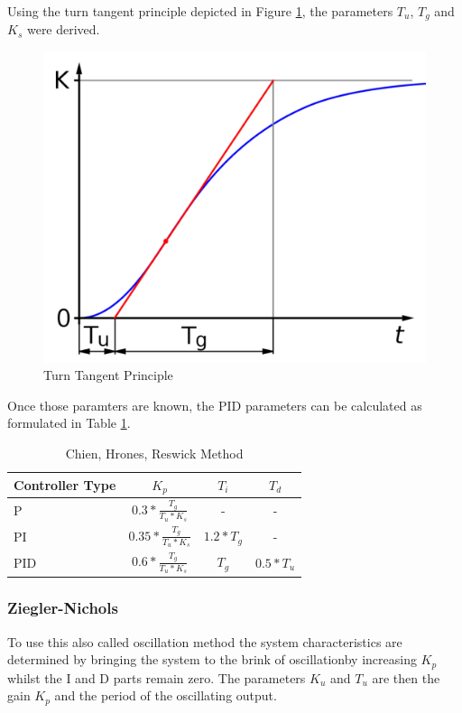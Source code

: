 Using the turn tangent principle depicted in Figure \ref{fig:wendetangentenverfahren}, the parameters $T_u$, $T_g$ and $K_s$ were derived.

\begin{figure}[H]
\begin{center}
\includegraphics[width=0.6\linewidth]{images/general/wendetangentenverfahren}
\end{center}
\caption{Turn Tangent Principle}
\label{fig:wendetangentenverfahren}
\end{figure}

Once those paramters are known, the PID parameters can be calculated as formulated in Table \ref{tab:chien}.

\begin{table}[H]
\begin{center}
\begin{tabular}{ l | c | c | c}
  Controller Type & $K_p$ & $T_i$ & $T_d$\\
  \hline
  \hline
  P & $0.3 * \frac{T_g}{T_u * K_s}$& - & -\\
  \hline
  PI & $0.35 * \frac{T_g}{T_u * K_s}$ & $1.2 * T_g$ & - \\
  \hline
  PID & $0.6 * \frac{T_g}{T_u * K_s}$ & $T_g$ & $0.5 * T_u$\\
  \hline
\end{tabular}
\end{center}
\caption{Chien, Hrones, Reswick Method}
\label{tab:chien}
\end{table}

\subsubsection{Ziegler-Nichols}
\label{subs:Ziegler-Nichols}

To use this also called oscillation method the system characteristics are determined by bringing the system to the brink of oscillationby increasing $K_p$ whilst the I and D parts remain zero. The parameters $K_u$ and $T_u$ are then the gain $K_p$ and the period of the oscillating output.

